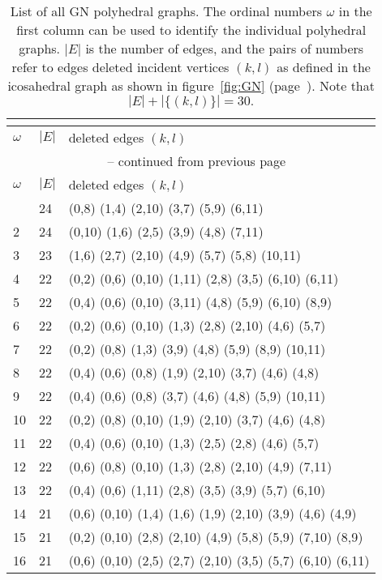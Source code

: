 \footnotesize{\begin{longtable}{lll}
    \caption{List of all GN polyhedral graphs. The ordinal numbers $\omega$ in the first column
    can be used to identify the individual polyhedral graphs.
    $|E|$ is the number of edges, and the pairs of numbers refer to edges deleted
    incident vertices $(k,l)$ as defined in the icosahedral graph
    as shown in figure~\ref{fig:GN} (page~\pageref{fig:GN}). Note that $|E|+|\{(k,l)\}|=30.$}\\
    \label{tab:icosubgraphs}\\
%
\toprule
    $\omega$  & $|E|$  &  deleted edges $(k,l)$\\\midrule
\endfirsthead
\multicolumn{3}{c}{\tablename~\thetable{} -- continued from previous page}\\
\toprule
    $\omega$  & $|E|$  &  deleted edges $(k,l)$\\\midrule
\endhead
\bottomrule\endfoot
1   & 24 & (0,8) (1,4) (2,10) (3,7) (5,9) (6,11) \\
2   & 24 & (0,10) (1,6) (2,5) (3,9) (4,8) (7,11) \\
3   & 23 & (1,6) (2,7) (2,10) (4,9) (5,7) (5,8) (10,11) \\
4   & 22 & (0,2) (0,6) (0,10) (1,11) (2,8) (3,5) (6,10) (6,11) \\
5   & 22 & (0,4) (0,6) (0,10) (3,11) (4,8) (5,9) (6,10) (8,9) \\
6   & 22 & (0,2) (0,6) (0,10) (1,3) (2,8) (2,10) (4,6) (5,7) \\
7   & 22 & (0,2) (0,8) (1,3) (3,9) (4,8) (5,9) (8,9) (10,11) \\
8   & 22 & (0,4) (0,6) (0,8) (1,9) (2,10) (3,7) (4,6) (4,8) \\
9   & 22 & (0,4) (0,6) (0,8) (3,7) (4,6) (4,8) (5,9) (10,11) \\
10  & 22 & (0,2) (0,8) (0,10) (1,9) (2,10) (3,7) (4,6) (4,8) \\
11  & 22 & (0,4) (0,6) (0,10) (1,3) (2,5) (2,8) (4,6) (5,7) \\
12  & 22 & (0,6) (0,8) (0,10) (1,3) (2,8) (2,10) (4,9) (7,11) \\
13  & 22 & (0,4) (0,6) (1,11) (2,8) (3,5) (3,9) (5,7) (6,10) \\
14  & 21 & (0,6) (0,10) (1,4) (1,6) (1,9) (2,10) (3,9) (4,6) (4,9) \\
15  & 21 & (0,2) (0,10) (2,8) (2,10) (4,9) (5,8) (5,9) (7,10) (8,9) \\
16  & 21 & (0,6) (0,10) (2,5) (2,7) (2,10) (3,5) (5,7) (6,10) (6,11) \\

\end{longtable}}
